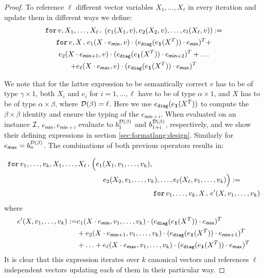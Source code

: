 \begin{proof}
To reference $\ell$ different vector variables $X_1,\ldots,X_\ell$ in every iteration and update them in different ways we define:
\begin{multline*}
\texttt{for}\, v,X_1,\ldots, X_\ell \texttt{.}\, \left( e_1(X_1,v), e_2(X_2,v), \ldots, e_l(X_\ell,v) \right) := \\
\texttt{for}\, v,X \texttt{.}\, e_1(X\cdot e_{\mathsf{min}},v)\cdot (e_{\texttt{diag}}(e_{\mathbf{1}}(X^T))\cdot e_{\mathsf{min}})^T +\\ e_2(X\cdot e_{\mathsf{min} + 1},v)\cdot (e_{\texttt{diag}}(e_{\mathbf{1}}(X^T))\cdot e_{\mathsf{min} + 2})^T + \ldots \\
+ e_\ell(X\cdot e_{\mathsf{max}},v)\cdot (e_{\texttt{diag}}(e_{\mathbf{1}}(X^T))\cdot e_{\mathsf{max}})^T \\
\end{multline*}

We note that for the latter expression to be semantically correct $v$ has to be of type $\gamma\times 1$, 
both $X_i$ and $e_i$ for $ i=1,\ldots,\ell$ have to be of type $\alpha\times 1$, 
and $X$ has to be of type $\alpha\times\beta$, where $\mathcal{D}(\beta)=\ell$. Here
we use $e_{\texttt{diag}}(e_{\mathbf{1}}(X^T))$ to compute the $\beta\times\beta$ identity and ensure the typing of the
$e_{\mathsf{min} + i}$.
When evaluated on an instance $\mathcal{I}$,
$e_{\mathsf{min}}, e_{\mathsf{min} + i}$ evaluate to $b_1^{\mathcal{D}(\beta)}$ and $b_{1+i}^{\mathcal{D}(\beta)}$, 
respectively, and we show their defining expressions in section \ref{sec:formatlang:design}.
Similarly for $e_{\mathsf{max}}=b_n^{\mathcal{D}(\beta)}$.
The combinations of both previous operators results in:

\begin{align*}
    \texttt{for}\, v_1,\ldots, v_k,X_1,\ldots, X_\ell \texttt{.}\, \Big( &e_1(X_1,v_1,\ldots, v_k), \\
    &\hspace{1em}e_2(X_2,v_1,\ldots, v_k), \ldots, e_\ell(X_\ell,v_1,\ldots, v_k) \Big) := \\
    &\hspace{8em}\texttt{for}\, v_1,\ldots, v_k,X \texttt{.}\, e'(X,v_1,\ldots, v_k) \\
\end{align*}
where 
\begin{align*}
e'(X,v_1,\ldots,v_k):=&e_1(X\cdot e_{\mathsf{min}},v_1,\ldots,v_k)\cdot (e_{\texttt{diag}}(e_{\mathbf{1}}(X^T))\cdot e_{\mathsf{min}})^T \\
&+ e_2(X\cdot e_{\mathsf{min} + 1},v_1,\ldots,v_k)\cdot (e_{\texttt{diag}}(e_{\mathbf{1}}(X^T))\cdot e_{\mathsf{min} + 1})^T \\
&+ \ldots + e_\ell(X\cdot e_{\mathsf{max}},v_1,\ldots,v_k)\cdot (e_{\texttt{diag}}(e_{\mathbf{1}}(X^T))\cdot e_{\mathsf{max}})^T
\end{align*}
It is clear that this expression iterates over $k$ canonical vectors and references $\ell$ independent vectors updating each of them in their particular way.


\end{proof}
